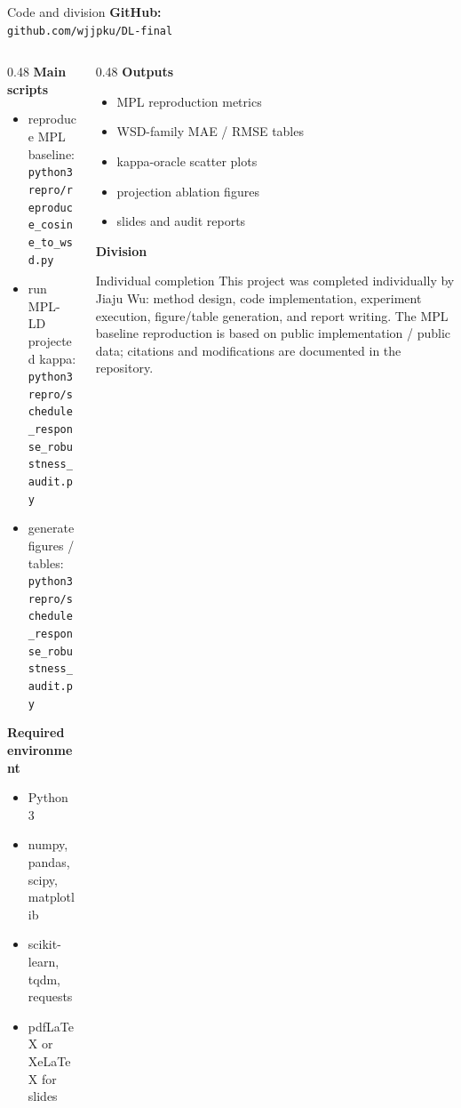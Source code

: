 \documentclass[9pt,aspectratio=169]{beamer}
\newcommand{\code}[1]{\texttt{\small #1}}
\newcommand{\tightlist}{\setlength{\itemsep}{2pt}\setlength{\parskip}{0pt}}
\begin{document}
\begin{frame}{Code and division}
\small
\textbf{GitHub:}\\
\code{github.com/wjjpku/DL-final}

\vfill
\begin{columns}[T]
\begin{column}{0.48\textwidth}
\textbf{Main scripts}
\begin{itemize}\tightlist
\item reproduce MPL baseline:\\
\code{python3 repro/reproduce\_cosine\_to\_wsd.py}
\item run MPL-LD projected kappa:\\
\code{python3 repro/schedule\_response\_robustness\_audit.py}
\item generate figures / tables:\\
\code{python3 repro/schedule\_response\_robustness\_audit.py}
\end{itemize}

\textbf{Required environment}
\begin{itemize}\tightlist
\item Python 3
\item numpy, pandas, scipy, matplotlib
\item scikit-learn, tqdm, requests
\item pdfLaTeX or XeLaTeX for slides
\end{itemize}
\end{column}
\begin{column}{0.48\textwidth}
\textbf{Outputs}
\begin{itemize}\tightlist
\item MPL reproduction metrics
\item WSD-family MAE / RMSE tables
\item kappa-oracle scatter plots
\item projection ablation figures
\item slides and audit reports
\end{itemize}

\textbf{Division}
\begin{block}{Individual completion}
This project was completed individually by Jiaju Wu:
method design, code implementation, experiment execution,
figure/table generation, and report writing.
The MPL baseline reproduction is based on public implementation / public data;
citations and modifications are documented in the repository.
\end{block}
\end{column}
\end{columns}
\end{frame}
\end{document}

